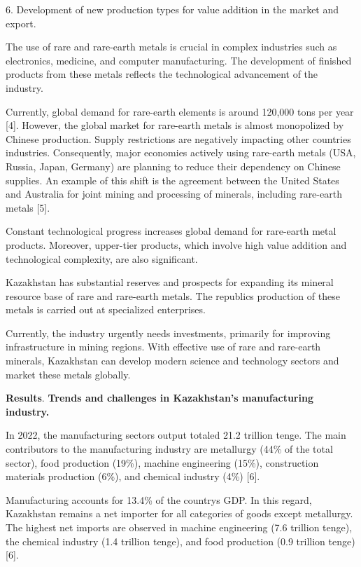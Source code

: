 \begin{multicols}{2}
6. Development of new production types for value addition in the market
and export.

The use of rare and rare-earth metals is crucial in complex industries
such as electronics, medicine, and computer manufacturing. The
development of finished products from these metals reflects the
technological advancement of the industry.

Currently, global demand for rare-earth elements is around 120,000 tons
per year {[}4{]}. However, the global market for rare-earth metals is
almost monopolized by Chinese production. Supply restrictions are
negatively impacting other countries\textquotesingle{} industries.
Consequently, major economies actively using rare-earth metals (USA,
Russia, Japan, Germany) are planning to reduce their dependency on
Chinese supplies. An example of this shift is the agreement between the
United States and Australia for joint mining and processing of minerals,
including rare-earth metals {[}5{]}.

Constant technological progress increases global demand for rare-earth
metal products. Moreover, upper-tier products, which involve high value
addition and technological complexity, are also significant.

Kazakhstan has substantial reserves and prospects for expanding its
mineral resource base of rare and rare-earth metals. The
republic\textquotesingle s production of these metals is carried out at
specialized enterprises.

Currently, the industry urgently needs investments, primarily for
improving infrastructure in mining regions. With effective use of rare
and rare-earth minerals, Kazakhstan can develop modern science and
technology sectors and market these metals globally.

{\bfseries Results}. {\bfseries Trends and challenges in Kazakhstan's
manufacturing industry.}

In 2022, the manufacturing sector\textquotesingle s output totaled 21.2
trillion tenge. The main contributors to the manufacturing industry are
metallurgy (44\% of the total sector), food production (19\%), machine
engineering (15\%), construction materials production (6\%), and
chemical industry (4\%) {[}6{]}.

Manufacturing accounts for 13.4\% of the country\textquotesingle s GDP.
In this regard, Kazakhstan remains a net importer for all categories of
goods except metallurgy. The highest net imports are observed in machine
engineering (7.6 trillion tenge), the chemical industry (1.4 trillion
tenge), and food production (0.9 trillion tenge) {[}6{]}.


\end{multicols}
